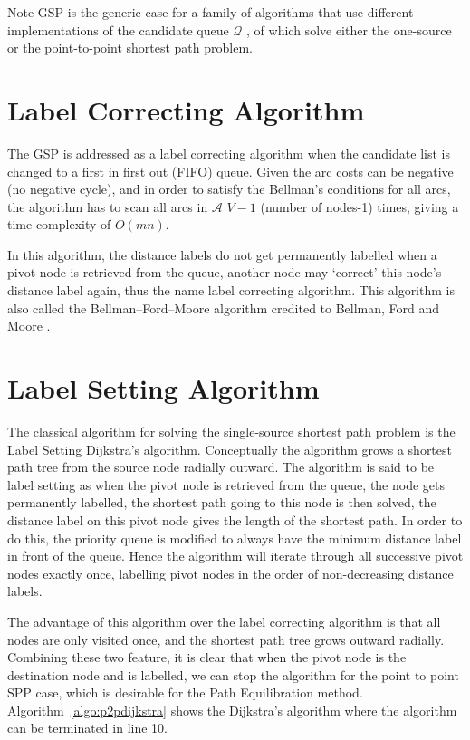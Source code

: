 Note GSP is the generic case for a family of algorithms
that use different implementations of the candidate queue $\mathcal{Q}$ \citep{mplomer},
of which solve either the one-source or the point-to-point shortest path problem.

\section{Label Correcting Algorithm}
\label{section:labelcorrectingalgorithm}
The GSP is addressed as a label correcting algorithm when the candidate list is changed to
a first in first out (FIFO) queue.
Given the arc costs can be negative (no negative cycle),
and in order to satisfy the Bellman's conditions for all arcs,
the algorithm has to scan all arcs in $\mathcal{A}$ $V-1$ (number of nodes-1) times,
giving a time complexity of $O(mn)$.

In this algorithm,
the distance labels do not get permanently labelled when a pivot node is retrieved from the queue,
another node may `correct' this node's distance label again,
thus the name label correcting algorithm.
This algorithm is also called the Bellman–Ford–Moore algorithm credited to Bellman, Ford and Moore \citep{Bellman,Ford, Moore}.

\section{Label Setting Algorithm}
\label{section:labelsettingalgorithm}
The classical algorithm for solving the single-source shortest path problem is the Label Setting Dijkstra's algorithm.
Conceptually the algorithm grows a shortest path tree from the source node radially outward.
The algorithm is said to be label setting as when the pivot node is retrieved from the queue,
the node gets permanently labelled,
the shortest path going to this node is then solved,
the distance label on this pivot node gives the length of the shortest path.
In order to do this, 
the priority queue is modified to always have the minimum distance label in front of the queue.
Hence the algorithm will iterate through all successive pivot nodes exactly once,
labelling pivot nodes in the order of non-decreasing distance labels.

The advantage of this algorithm over the label correcting algorithm is
that all nodes are only visited once,
and the shortest path tree grows outward radially.
Combining these two feature,
it is clear that when the pivot node is the destination node and is 
labelled,
we can stop the algorithm for the point to point SPP case,
which is desirable for the Path Equilibration method.
Algorithm~\ref{algo:p2pdijkstra} shows the Dijkstra's algorithm where the algorithm can be terminated in line 10.

